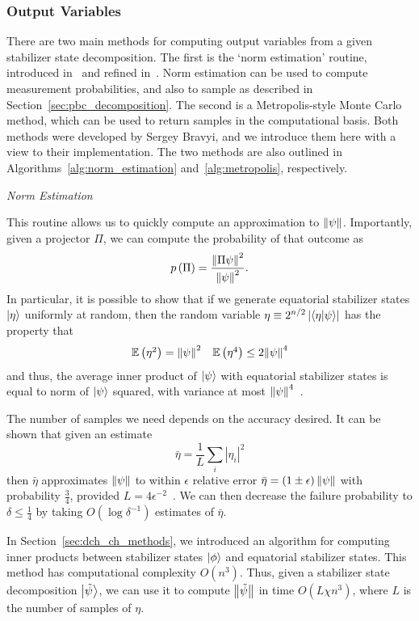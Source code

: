 \subsubsection{Output Variables}
There are two main methods for computing output variables from a given stabilizer state decomposition. The first is the `norm estimation' routine, introduced in~\cite{Bravyi2016} and refined in~\cite{Bravyi2018}. Norm estimation can be used to compute measurement probabilities, and also to sample as described in Section~\ref{sec:pbc_decomposition}. The second is a Metropolis-style Monte Carlo method, which can be used to return samples in the computational basis. Both methods were developed by Sergey Bravyi, and we introduce them here with a view to their implementation. The two methods are also outlined in Algorithms~\ref{alg:norm_estimation} and~\ref{alg:metropolis}, respectively.\par
\large{\itshape{Norm Estimation}}\par
This routine allows us to quickly compute an approximation to $\norm{\psi}$. Importantly, given a projector $\Pi$, we can compute the probability of that outcome as
\begin{equation}
p\left(\Pi\right) = \frac{\norm{\Pi \psi}^{2}}{\norm{\psi}^{2}}.
\end{equation}
In particular, it is possible to show that if we generate equatorial stabilizer states $\ket{\eta}$ uniformly at random, then the random variable $\eta\equiv 2^{n/2}\left|\braket{\eta}{\psi}\right|$ has the property that
\[
\begin{array}{l r}
\mathbb{E}\left(\eta^{2}\right) = \norm{\psi}^{2} & \mathbb{E}\left(\eta^{4}\right) \leq 2\norm{\psi}^{4}
\end{array}
\]
and thus, the average inner product of $\ket{\psi}$ with equatorial stabilizer states is equal to norm of $\ket{\psi}$ squared, with variance at most $\norm{\psi}^{4}$~\cite{Bravyi2018}.\par
The number of samples we need depends on the accuracy desired. It can be shown that given an estimate 
\[\bar{\eta}=\frac{1}{L}\sum_{i}\left|\eta_{i}\right|^{2}\]
then $\bar{\eta}$ approximates $\norm{\psi}$ to within $\epsilon$ relative error $\bar{\eta}=\left(1\pm \epsilon\right)\norm{\psi}$ with probability $\frac{3}{4}$, provided $L=4\epsilon^{-2}$~\cite{Bravyi2018}. We can then decrease the failure probability to $\delta\leq \frac{1}{4}$ by taking $O\left(\log{\delta^{-1}}\right)$ estimates of $\bar{\eta}$.\par
In Section~\ref{sec:dch_ch_methods}, we introduced an algorithm for computing inner products between stabilizer states $\ket{\phi}$ and equatorial stabilizer states. This method has computational complexity $O(n^{3})$. Thus, given a stabilizer state decomposition $\ket{\tilde{\psi}}$, we can use it to compute $\norm{\tilde{\psi}}$ in time $O(L\chi n^{3})$, where $L$ is the number of samples of $\eta$.\par
